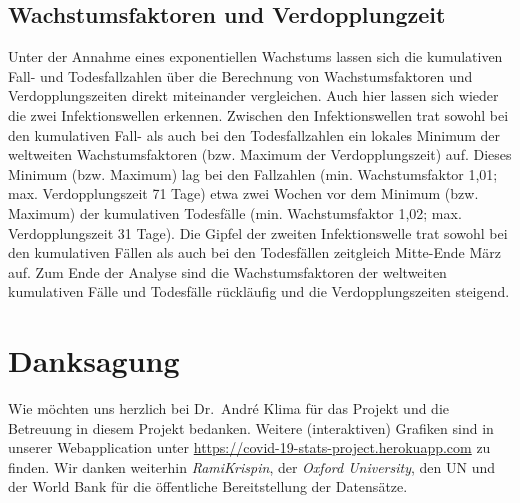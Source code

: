 \documentclass[12pt, a4paper]{article}
\begin{document}
\subsection{Wachstumsfaktoren und Verdopplungzeit}
Unter der Annahme eines exponentiellen Wachstums lassen sich die kumulativen Fall- und Todesfallzahlen über die Berechnung von Wachstumsfaktoren und Verdopplungszeiten direkt miteinander vergleichen. Auch hier lassen sich wieder die zwei Infektionswellen erkennen. Zwischen den Infektionswellen trat sowohl bei den kumulativen Fall- als auch bei den Todesfallzahlen ein lokales Minimum der weltweiten Wachstumsfaktoren (bzw. Maximum der Verdopplungszeit) auf. Dieses Minimum (bzw. Maximum) lag bei den Fallzahlen (min. Wachstumsfaktor 1,01; max. Verdopplungszeit 71 Tage) etwa zwei Wochen vor dem Minimum (bzw. Maximum) der kumulativen Todesfälle (min. Wachstumsfaktor 1,02; max. Verdopplungszeit 31 Tage). Die Gipfel der zweiten Infektionswelle trat sowohl bei den kumulativen Fällen als auch bei den Todesfällen zeitgleich Mitte-Ende März auf.
Zum Ende der Analyse sind die Wachstumsfaktoren der weltweiten kumulativen Fälle und Todesfälle rückläufig und die Verdopplungszeiten steigend. 

\section{Danksagung}
Wie möchten uns herzlich bei Dr.\ Andr\'{e} Klima für das Projekt und die Betreuung in diesem Projekt bedanken. Weitere (interaktiven) Grafiken sind in unserer Webapplication unter \url{https://covid-19-stats-project.herokuapp.com} zu finden. Wir danken weiterhin \emph{RamiKrispin}, der \emph{Oxford University}, den UN und der World Bank für die öffentliche Bereitstellung der Datensätze. 
\end{document}
